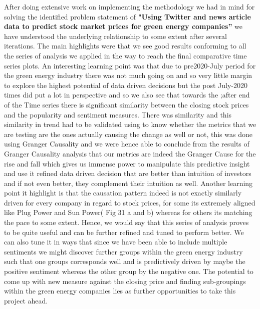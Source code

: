 \documentclass[sigconf, nonacm]{acmart}
\begin{document}
After doing extensive work on implementing the methodology we had in mind for solving the identified problem statement of \textbf{"Using Twitter and news article data to predict stock market prices for green energy companies”} we have understood the underlying relationship to some extent after several iterations. The main highlights were that we see good results conforming to all the series of analysis we applied in the way to reach the final comparative time series plots. An interesting learning point was that due to pre2020-July period for the green energy industry there was not much going on and so very little margin to explore the highest potential of data driven decisions but the post July-2020 times did put a lot in perspective and so we also see that towards the ;after end of the Time series there is significant similarity between the closing stock prices and the popularity and sentiment measures. There was similarity and this similarity in trend had to be validated using to know whether the metrics that we are testing are the ones actually causing the change as well or not, this was done using Granger Causality and we were hence able to conclude from the results of Granger Causality analysis that our metrics are indeed the Granger Cause for the rise and fall which gives us immense power to manipulate this predictive insight and use it refined data driven decision that are better than intuition of investors and if not even better, they complement their intuition as well. Another learning point it highlight is that the causation pattern indeed is not exactly similarly driven for every company in regard to stock prices, for some its extremely aligned like Plug Power and Sun Power( Fig 31 a and b) whereas for others its matching the pace to some extent. Hence, we would say that this series of analysis proves to be quite useful and can be further refined and tuned to perform better. We can also tune it in ways that since we have been able to include multiple sentiments we might discover further groups within the green energy industry such that one groups corresponds well and is predictively driven by maybe the positive sentiment whereas the other group by the negative one. The potential to come up with new measure against the closing price and finding sub-groupings within the green energy companies lies as further opportunities to take this project ahead.





\end{document}
